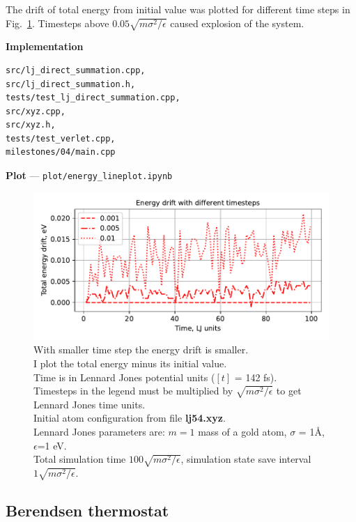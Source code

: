 \documentclass[12pt,a4paper]{article}
\begin{document}
The drift of total energy from initial value was plotted for different time steps in Fig.~\ref{fig:first_simulation}. Timesteps above $0.05 \sqrt{m\sigma^2 / \epsilon}$ caused explosion of the system.

{\bf Implementation}
\begin{lstlisting}[breaklines]
src/lj_direct_summation.cpp, 
src/lj_direct_summation.h,
tests/test_lj_direct_summation.cpp,
src/xyz.cpp,
src/xyz.h,
tests/test_verlet.cpp,
milestones/04/main.cpp
\end{lstlisting}


{\bf Plot} --- \verb|plot/energy_lineplot.ipynb|

\begin{figure}[htb]
	\centering
	\includegraphics[width=.7\linewidth]{img/milestone04-total.pdf}
	\caption{With smaller time step the energy drift is smaller.\\
		I plot the total energy minus its initial value.\\
		Time is in Lennard Jones potential units ($[t]$ = 142 fs).\\
		Timesteps in the legend must be multiplied by $\sqrt{m\sigma^2 / \epsilon}$ to get Lennard Jones time units.\\
		Initial atom configuration from file {\bf lj54.xyz}.\\
		Lennard Jones parameters are: $m=1$ mass of a gold atom, $\sigma$ = 1Å, $\epsilon$=1 eV.\\
		Total simulation time \( 100 \sqrt{m\sigma^2 / \epsilon} \), simulation state save interval \( 1 \sqrt{m\sigma^2 / \epsilon} \).}
	\label{fig:first_simulation}
\end{figure}

\clearpage


\subsection*{Berendsen thermostat}
\end{document}
